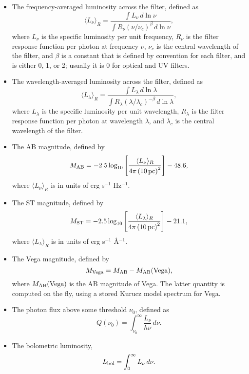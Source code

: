 \documentclass[12pt]{article}
\begin{document}
\begin{itemize}
\item The frequency-averaged luminosity across the filter, defined as
\begin{equation}
\langle L_\nu\rangle_R = \frac{\int L_\nu \, d\ln\nu}{\int R_\nu (\nu/\nu_c)^\beta \, d\ln\nu},
\end{equation}
where $L_\nu$ is the specific luminosity per unit frequency, $R_\nu$ is the filter response function per photon at frequency $\nu$, $\nu_c$ is the central wavelength of the filter, and $\beta$ is a constant that is defined by convention for each filter, and is either 0, 1, or 2; usually it is 0 for optical and UV filters.
\item The wavelength-averaged luminosity across the filter, defined as
\begin{equation}
\langle L_\lambda\rangle_R = \frac{\int L_\lambda \, d\ln\lambda}{\int R_\lambda (\lambda/\lambda_c)^{-\beta} \, d\ln\lambda},
\end{equation}
where $L_\lambda$ is the specific luminosity per unit wavelength, $R_\lambda$ is the filter response function per photon at wavelength $\lambda$, and $\lambda_c$ is the central wavelength of the filter.
\item The AB magnitude, defined by
\begin{equation}
M_{\rm AB} = -2.5 \log_{10} \left[\frac{\langle L_\nu\rangle_R}{4\pi\left(10\,\mathrm{pc}\right)^2}\right] - 48.6,
\end{equation}
where $\langle L_\nu\rangle_R$ is in units of erg s$^{-1}$ Hz$^{-1}$.
\item The ST magnitude, defined by
\begin{equation}
M_{\rm ST} = -2.5 \log_{10} \left[\frac{\langle L_\lambda\rangle_R}{4\pi\left(10\,\mathrm{pc}\right)^2}\right] - 21.1,
\end{equation}
where $\langle L_\lambda\rangle_R$ is in units of erg s$^{-1}$ \AA$^{-1}$.
\item The Vega magnitude, defined by
\begin{equation}
M_{\rm Vega} = M_{\rm AB} - M_{\rm AB}(\mbox{Vega}),
\end{equation}
where $M_{\rm AB}(\mbox{Vega})$ is the AB magnitude of Vega. The latter quantity is computed on the fly, using a stored Kurucz model spectrum for Vega. 
\item The photon flux above some threshold $\nu_0$, defined as
\begin{equation}
Q(\nu_0) = \int_{\nu_0}^\infty \frac{L_\nu}{h\nu} \, d\nu.
\end{equation}
\item The bolometric luminosity,
\begin{equation}
L_{\rm bol} = \int_0^\infty L_\nu \, d\nu.
\end{equation}
\end{itemize}
\end{document}
